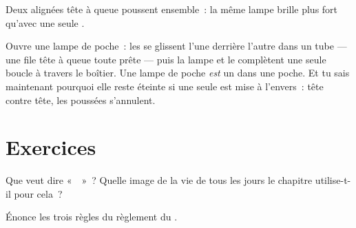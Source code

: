 \begin{omfigure}

{\small Deux  alignées tête à queue poussent ensemble~: la même
lampe brille plus fort qu'avec une seule .}
\end{omfigure}

\begin{example}\label{ex:g4:series-circuits:flashlight}
Ouvre une lampe de poche~: les  se glissent l'une derrière
l'autre dans un tube --- une file tête à queue toute prête --- puis
la lampe et le  complètent une seule boucle à
travers le boîtier. Une lampe de poche \emph{est} un 
dans une poche. Et tu sais maintenant pourquoi elle reste éteinte si
une seule  est mise à l'envers~: tête contre tête, les poussées
s'annulent.
\end{example}

\section{Exercices}

\begin{exercise}[$\star$]\label{exo:g4:series-circuits:1}
Que veut dire «~~»~? Quelle image de la vie de tous les jours
le chapitre utilise-t-il pour cela~?
\end{exercise}

\begin{exercise}[$\star$]\label{exo:g4:series-circuits:2}
Énonce les trois règles du règlement du .
\end{exercise}

